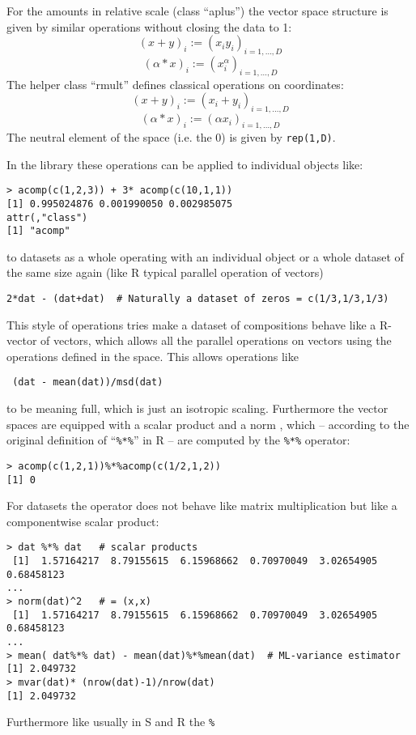 \documentclass{article}
\newcommand{\code}[1]{{\tt #1}}
\begin{document}
For the amounts in relative scale (class ``aplus'') the vector space structure
is given by similar operations without closing the data to 1:
\[
(x+y)_i := \left(x_iy_i\right)_{i=1,\ldots,D}
\]
\[
(\alpha*x)_i := \left(x_i^\alpha\right)_{i=1,\ldots,D}
\]
The helper class ``rmult'' defines classical operations on coordinates:
\[
(x+y)_i := \left(x_i+y_i\right)_{i=1,\ldots,D}
\]
\[
(\alpha*x)_i := \left(\alpha x_i\right)_{i=1,\ldots,D}
\]
The neutral element of the space (i.e. the 0) is given by
\code{rep(1,D)}.\par
In the library these operations can be applied to individual objects like:
\begin{verbatim}
> acomp(c(1,2,3)) + 3* acomp(c(10,1,1))
[1] 0.995024876 0.001990050 0.002985075
attr(,"class")
[1] "acomp"
\end{verbatim}
to datasets as a whole operating with an individual object or a whole dataset
of the same size again (like R typical parallel operation of vectors)
\begin{verbatim}
2*dat - (dat+dat)  # Naturally a dataset of zeros = c(1/3,1/3,1/3)
\end{verbatim}
This style of operations tries make a dataset of compositions behave like a
R-vector  of vectors, which allows all the parallel operations on vectors
using the operations defined in the space. This allows operations like
\begin{verbatim}
 (dat - mean(dat))/msd(dat)
\end{verbatim}
to be meaning full, which is just an isotropic scaling. Furthermore the vector
spaces are equipped with a scalar product and a norm \cite{BM+01}, which --
according to the original
definition of ``\verb+%*%+'' in R -- are computed by the \verb+%*%+ operator:
\begin{verbatim}
> acomp(c(1,2,1))%*%acomp(c(1/2,1,2)) 
[1] 0
\end{verbatim}
For datasets the operator does not behave like matrix multiplication but like
a componentwise scalar product:
\begin{verbatim}
> dat %*% dat   # scalar products 
 [1]  1.57164217  8.79155615  6.15968662  0.70970049  3.02654905  0.68458123
...
> norm(dat)^2   # = (x,x)
 [1]  1.57164217  8.79155615  6.15968662  0.70970049  3.02654905  0.68458123
...
> mean( dat%*% dat) - mean(dat)%*%mean(dat)  # ML-variance estimator
[1] 2.049732
> mvar(dat)* (nrow(dat)-1)/nrow(dat) 
[1] 2.049732
\end{verbatim}
Furthermore like usually in S and R the \verb+%+%
\end{document}
